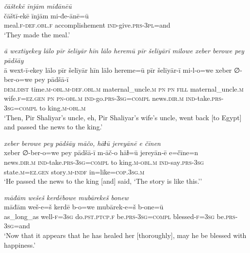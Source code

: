 \ea \label{ŽP.255}
\textit{čāštekē īnjām miđānēū} \\ 
\gll čāštī-ekē īnjām mi-đe-ānē=ū \\ 
 meal\textsc{.f}\textsc{-def}\textsc{.obl}\textsc{.f} accomplishement \textsc{ind-}give\textsc{.prs}\textsc{-3pl}=and \\ 
\glt `They made the meal.'
\z 
 
\ea \label{ŽP.258}
\textit{ā wextīyekey lālo pīr šelīyār hīn lālo heremū pīr šelīyārī milowe xeber berowe pey pādšāy} \\ 
\gll ā wext-ī-ekey lālo pīr šelīyār hīn lālo hereme=ū pīr šelīyār-ī mi-l-o=we xeber ∅-ber-o=we pey pādšā-ī \\ 
 \textsc{dem.dist} time\textsc{.m}\textsc{-obl}\textsc{.m}\textsc{-def}\textsc{.obl}\textsc{.m} maternal\_uncle\textsc{.m} \textsc{pn} \textsc{pn} \textsc{fill} maternal\_uncle\textsc{.m} wife\textsc{.f}\textsc{\textsc{=ez.gen}} \textsc{pn} \textsc{pn}\textsc{-obl}\textsc{.m} \textsc{ind-}go\textsc{.prs}\textsc{-3sg}\textsc{=compl} news\textsc{.dir}\textsc{.m} \textsc{ind-}take\textsc{.prs}\textsc{-3sg}\textsc{=compl} to king\textsc{.m}\textsc{-obl}\textsc{.m} \\ 
\glt `Then, Pir Shaliyar’s uncle, eh, Pir Shaliyar’s wife’s uncle, went back [to Egypt] and passed the news to the king.'
\z 
 
\ea \label{ŽP.259}
\textit{xeber berowe pey pādšāy māčo, hāɫū jereyānē e čīnen} \\ 
\gll xeber ∅-ber-o=we pey pādšā-ī m-āč-o hāɫ=ū jereyān-ē e=čīne=n \\ 
 news\textsc{.dir}\textsc{.m} \textsc{ind-}take\textsc{.prs}\textsc{-3sg}\textsc{=compl} to king\textsc{.m}\textsc{-obl}\textsc{.m} \textsc{ind-}say\textsc{.prs}\textsc{-3sg} state\textsc{.m}\textsc{\textsc{=ez.gen}} story\textsc{.m}\textsc{-indf} in=like\textsc{=cop}\textsc{.3sg}\textsc{.m} \\ 
\glt `He passed the news to the king [and] said, ‘The story is like this.’'
\z 
 
\ea \label{ŽP.261}
\textit{māđām wešeš kerdēbowe mubārekeš bonew} \\ 
\gll māđām weš-e=š kerdē b-o=we mubārek-e=š b-one=ū \\ 
 as\_long\_as well\textsc{-f}\textsc{=3sg} do\textsc{.pst}\textsc{.ptcp}\textsc{.f} be\textsc{.prs}\textsc{-3sg}\textsc{=compl} blessed\textsc{-f}\textsc{=3sg} be\textsc{.prs}\textsc{-3sg}=and \\ 
\glt `Now that it appears that he has healed her [thoroughly], may he be blessed with happiness.'
\z 
 
